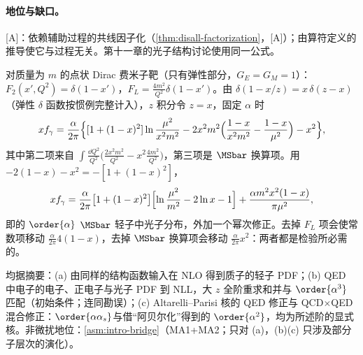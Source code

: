 \paragraph{地位与缺口。}[A]：依赖辅助过程的共线因子化（\cref{thm:disall-factorization}，[A]）；由算符定义的推导使它与过程无关。第十一章的光子结构讨论使用同一公式。

\begin{example}[点状靶极限]\label{ex:front-luxqed-pointlike}
对质量为 $m$ 的点状 Dirac 费米子靶（只有弹性部分，$G_E=G_M=1$）：$F_2(x',Q^2)=\delta(1-x')$，$F_L=\frac{4m^2}{Q^2}\delta(1-x')$。由 $\delta(1-x/z)=x\,\delta(z-x)$（弹性 $\delta$ 函数按惯例完整计入），$z$ 积分令 $z=x$，固定 $\alpha$ 时
\begin{equation*}
xf_\gamma=\frac{\alpha}{2\pi}\Bigl\{[1+(1-x)^2]\ln\frac{\mu^2}{x^2m^2}-2x^2m^2\Bigl(\frac{1-x}{x^2m^2}-\frac{1-x}{\mu^2}\Bigr)-x^2\Bigr\},
\end{equation*}
其中第二项来自 $\int\frac{\dd Q^2}{Q^2}\bigl(\frac{2x^2m^2}{Q^2}-x^2\frac{4m^2}{Q^2}\bigr)$，第三项是 $\MSbar$ 换算项。用 $-2(1-x)-x^2=-[1+(1-x)^2]$，
\begin{equation}\label{eq:front-luxqed-point}
xf_\gamma=\frac{\alpha}{2\pi}\bigl[1+(1-x)^2\bigr]\Bigl[\ln\frac{\mu^2}{m^2}-2\ln x-1\Bigr]+\frac{\alpha m^2x^2(1-x)}{\pi\mu^2},
\end{equation}
即\cite[式~(4.189)]{Frixione:2019lga}的 $\order{\alpha}$ $\MSbar$ 轻子中光子分布，外加一个幂次修正。去掉 $F_L$ 项会使常数项移动 $\frac{\alpha}{2\pi}4(1-x)$，去掉 $\MSbar$ 换算项会移动 $\frac{\alpha}{2\pi}x^2$：两者都是检验所必需的。
\end{example}

\begin{proposition}\label{prop:front-lepton-pdf}
均据摘要：(a) 由同样的结构函数输入在 NLO 得到质子的轻子 PDF\cite{Buonocore:2020nai}；(b) QED 中电子的电子、正电子与光子 PDF 到 NLL，大 $z$ 全阶重求和并与 $\order{\alpha^3}$ 匹配（初始条件\cite{Frixione:2019lga}；\cite{Bertone:2019hks}连同勘误）；(c) Altarelli--Parisi 核的 QED 修正与 QCD$\times$QED 混合修正：$\order{\alpha\alpha_s}$\cite{deFlorian:2015ujt}与借“阿贝尔化”得到的 $\order{\alpha^2}$\cite{deFlorian:2016gvk}，均为所述阶的显式核。非微扰地位：\cref{asm:intro-bridge}（MA1+MA2；只对 (a)，(b)(c) 只涉及部分子层次的演化）。
\end{proposition}

